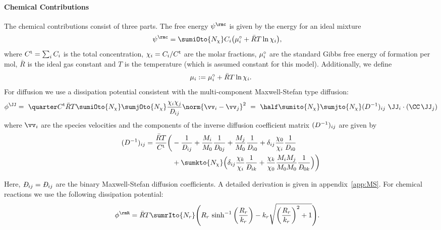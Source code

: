 \paragraph{Chemical Contributions} %
  The chemical contributions consist of three parts. The free energy $\psic$ is given by the energy for an ideal mixture
    \begin{align}
      &\psic =  \sumiOto{\Nchi} C_i \big(\munord_i + \RT\ln\chii \big), \label{eq:psic}
    \end{align}
    where $C^{\rm t}=\sum_i C_i$ is the total concentration, $\chi_{i}=C_i/C^{\rm t}$ are the molar fractions, $\mu^{\circ}_i$ are the standard Gibbs free energy of formation per mol, $\bar R$ is the ideal gas constant and $T$ is the temperature (which is assumed constant for this model). Additionally, we define
    \begin{align}
      \mu_i := \mu^{\circ}_i + \bar{R}T \ln\chi_i.
    \end{align}
    For diffusion we use a dissipation potential consistent with the multi-component Maxwell-Stefan type diffusion: 
    \begin{align}
      \begin{aligned}
      \phiJJ = \ \quarter\Ct\RT\sumiOto{\Nchi}\sumjOto{\Nchi} \frac{\chi_i\chi_j}{\DiffMS_{ij}} \norm{\vv_i-\vv_j}^2 \ = \  \half \sumito{\Nchi}\sumjto{\Nchi} \Dijinv \ \JJ_i \cdot (\CC \, \JJ_j)
      \end{aligned}
    \end{align}
    where $\vv_i$ are the species velocities and the components of the inverse diffusion coefficient matrix $(D^{-1})_{ij}$ are given by
    \begin{align}
      \begin{aligned}
      \Dijinv = \frac{\RT}{\Ct} 
      \bigg(  
        &- \frac{1}{\DiffMS_{ij}} 
        + \frac{M_i}{M_0}\frac{1}{\DiffMS_{0j}} 
        + \frac{M_j}{M_0}\frac{1}{\DiffMS_{i0}}  
        + \delta_{ij}\frac{\chi_0}{\chi_i}\frac{1}{\DiffMS_{i0}} \\
        &+ \sumkto{\Nchi} \Big( \delta_{ij} \frac{\chi_k}{\chi_i}\frac{1}{\DiffMS_{ik}} + \frac{\chi_k}{\chi_0}\frac{M_i M_j}{M_0 M_0} \frac{1}{\DiffMS_{0k}} \Big) 
      \bigg)
      \end{aligned}
    \end{align}
    
    Here, $\DiffMS_{ij}=\DiffMS_{ij}$ are the binary Maxwell-Stefan diffusion coefficients. A detailed derivation is given in appendix~\ref{app:MS}. For chemical reactions we use the following dissipation potential:
    \begin{align}
      &\phi^\rmR = \RT \sumrIto{N_r} \Bigg( R_r \, \sinh^{-1}\bigg(\frac{R_r}{\kr}\bigg) - k_r\sqrt{\bigg(\frac{R_r}{k_r}\bigg)^2+1}\Bigg).
    \end{align}
  
